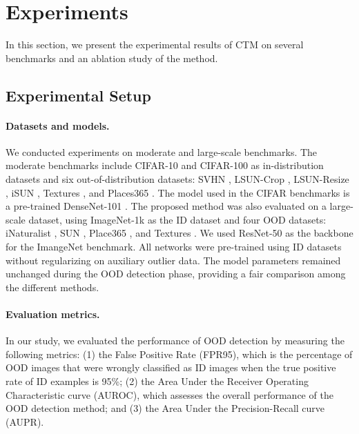 \documentclass[nohyperref]{article}
\theoremstyle{plain}
\theoremstyle{definition}
\theoremstyle{remark}
\newcommand{\shortname}{CTM}
\begin{document}
\section{Experiments}

In this section, we present the experimental results of \shortname\; on several benchmarks
and an ablation study of the method.

\subsection{Experimental Setup}
\label{sec:exp_set}
\paragraph{Datasets and models.} We conducted experiments on moderate and large-scale benchmarks. 
The moderate benchmarks include CIFAR-10 and CIFAR-100 \cite{krizhevsky2009learning} as in-distribution datasets and six out-of-distribution datasets: SVHN \cite{netzer2011reading}, LSUN-Crop \cite{yu2015lsun}, LSUN-Resize \cite{yu2015lsun}, iSUN \cite{xu2015turkergaze}, Textures \cite{cimpoi2014describing}, and  Places365 \cite{zhou2017places}.
The model used in the CIFAR benchmarks is a pre-trained DenseNet-101 \cite{huang2017densely}.
The proposed method was also evaluated on a large-scale dataset, using ImageNet-1k \cite{deng2009imagenet} as the ID dataset and four OOD datasets: iNaturalist \cite{van2018inaturalist}, SUN \cite{xiao2010sun}, Place365 \cite{zhou2017places}, and Textures \cite{cimpoi2014describing}.
We used ResNet-50 \cite{he2016deep} as the backbone for the ImangeNet benchmark. 
All networks were pre-trained using ID datasets without regularizing on auxiliary outlier data. 
The model parameters remained unchanged during the OOD detection phase, providing a fair comparison among the different methods. 

\paragraph{Evaluation metrics.}
In our study, we evaluated the performance of OOD detection by measuring the following metrics: (1) the False Positive Rate (FPR95), which is the percentage of OOD images that were wrongly classified as ID images when the true positive rate of ID examples is 95\%; (2) the Area Under the Receiver Operating Characteristic curve (AUROC), which assesses the overall performance of the OOD detection method; and (3) the Area Under the Precision-Recall curve (AUPR).
\end{document}

